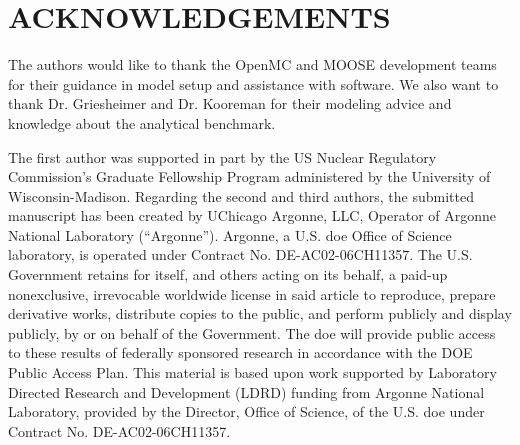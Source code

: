 \documentclass[letterpaper]{mc2023}
\begin{document}
\section*{ACKNOWLEDGEMENTS}
The authors would like to thank the OpenMC and MOOSE development teams for their guidance in model setup and assistance with software. We also want to thank
Dr. Griesheimer and Dr. Kooreman for their modeling advice and knowledge about the analytical benchmark.

The first author was supported in part by the US Nuclear Regulatory Commission's Graduate Fellowship Program administered by the University of Wisconsin-Madison.
Regarding the second and third authors, the submitted manuscript has been created by UChicago Argonne, LLC, Operator of Argonne National Laboratory (“Argonne”).
Argonne, a U.S. \gls{doe} Office of Science laboratory, is operated under Contract No. DE-AC02-06CH11357. The U.S. Government retains for itself, and others
acting on its behalf, a paid-up nonexclusive, irrevocable worldwide license in said article to reproduce, prepare derivative works, distribute copies to the
public, and perform publicly and display publicly, by or on behalf of the Government. The \gls{doe} will provide public access to these results of federally
sponsored research in accordance with the DOE Public Access Plan. This material is based upon work supported by Laboratory Directed Research and Development
(LDRD) funding from Argonne National Laboratory, provided by the Director, Office of Science, of the U.S. \gls{doe} under Contract No. DE-AC02-06CH11357.

\setlength{\baselineskip}{12pt}


\setlength{\baselineskip}{12pt}
\end{document}
